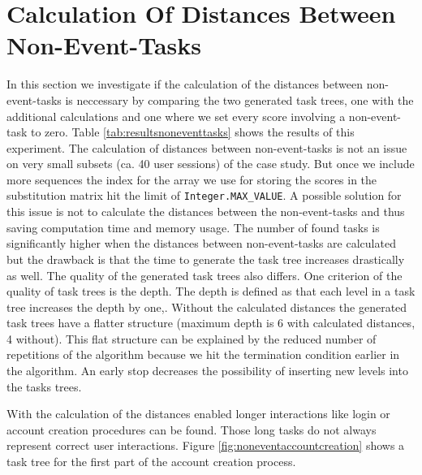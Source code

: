 \section{Calculation Of Distances Between Non-Event-Tasks}
\label{sec:noneventtasks}
In this section we investigate if the calculation of the distances between non-event-tasks is neccessary by comparing the two generated task trees, one with the additional calculations and one where
we set every score involving a non-event-task to zero. 
Table \ref{tab:resultsnoneventtasks} shows the results of this experiment.
The calculation of distances between non-event-tasks is not an issue on very small subsets (ca. 40 user sessions) of the case study. 
But once we include more sequences the index for the array we use for storing the scores in the substitution matrix hit the limit of \texttt{Integer.MAX\_VALUE}.
A possible solution for this issue is not to calculate the distances between the non-event-tasks and thus saving computation time and memory usage.
The number of found tasks is significantly higher when the distances between non-event-tasks are calculated but the drawback is that the time to generate the task tree increases drastically as well.
The quality of the generated task trees also differs.
One criterion of the quality of task trees is the depth. 
The depth is defined as that each level in a task tree increases the depth by one,.
Without the calculated distances the generated task trees have a flatter structure (maximum depth is 6 with calculated distances, 4 without).
This flat structure can be explained by the reduced number of repetitions of the algorithm because we hit the termination condition earlier in the algorithm.
An early stop decreases the possibility of inserting new levels into the tasks trees.

With the calculation of the distances enabled longer interactions like login or account creation procedures can be found.
Those long tasks do not always represent correct user interactions.
Figure \ref{fig:noneventaccountcreation} shows a task tree for the first part of the account creation process.

